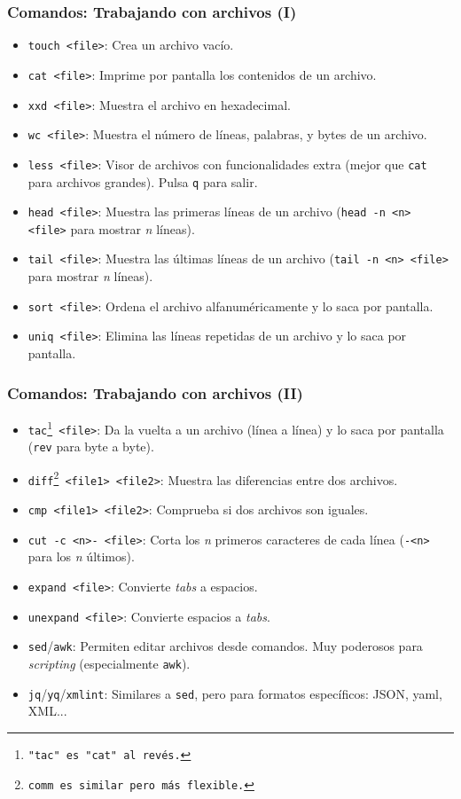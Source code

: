 \documentclass[aspectratio=43]{beamer}
\begin{document}
\begin{frame}
    \frametitle{Comandos: Trabajando con archivos (I)}

    \begin{itemize}
        \item \texttt{touch <file>}: Crea un archivo vacío.
        \item \texttt{cat <file>}: Imprime por pantalla los contenidos de un archivo.
        \item \texttt{xxd <file>}: Muestra el archivo en hexadecimal.
        \item \texttt{wc <file>}: Muestra el número de líneas, palabras, y bytes de un archivo.
        \item \texttt{less <file>}: Visor de archivos con funcionalidades extra (mejor que \texttt{cat} para archivos grandes). Pulsa \texttt{q} para salir.
        \item \texttt{head <file>}: Muestra las primeras líneas de un archivo (\texttt{head -n <n> <file>} para mostrar \textit{n} líneas).
        \item \texttt{tail <file>}: Muestra las últimas líneas de un archivo (\texttt{tail -n <n> <file>} para mostrar \textit{n} líneas).
        \item \texttt{sort <file>}: Ordena el archivo alfanuméricamente y lo saca por pantalla.
        \item \texttt{uniq <file>}: Elimina las líneas repetidas de un archivo y lo saca por pantalla.
    \end{itemize}
\end{frame}

\begin{frame}
    \frametitle{Comandos: Trabajando con archivos (II)}

    \begin{itemize}
        \item \texttt{tac\footnote{"tac" es "cat" al revés.} <file>}: Da la vuelta a un archivo (línea a línea) y lo saca por pantalla (\texttt{rev} para byte a byte).
        \item \texttt{diff\footnote{\texttt{comm} es similar pero más flexible.} <file1> <file2>}: Muestra las diferencias entre dos archivos.
        \item \texttt{cmp <file1> <file2>}: Comprueba si dos archivos son iguales.
        \item \texttt{cut -c <n>- <file>}: Corta los \textit{n} primeros caracteres de cada línea (\texttt{-<n>} para los \textit{n} últimos).
        \item \texttt{expand <file>}: Convierte \textit{tabs} a espacios.
        \item \texttt{unexpand <file>}: Convierte espacios a \textit{tabs}.
        \item \texttt{sed}/\texttt{awk}: Permiten editar archivos desde comandos. Muy poderosos para \textit{scripting} (especialmente \texttt{awk}).
        \item \texttt{jq}/\texttt{yq}/\texttt{xmlint}: Similares a \texttt{sed}, pero para formatos específicos: JSON, yaml, XML...
    \end{itemize}
\end{frame}
\end{document}
